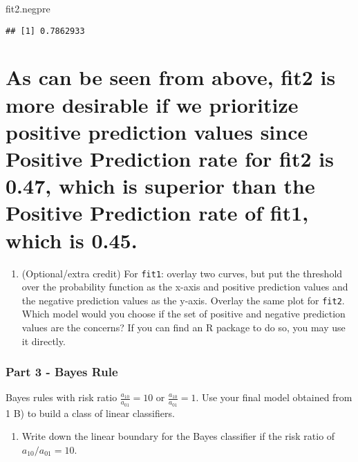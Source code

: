 \documentclass[]{article}
\newenvironment{Shaded}{\begin{snugshade}}{\end{snugshade}}
\newcommand{\NormalTok}[1]{#1}
\providecommand{\tightlist}{%
  \setlength{\itemsep}{0pt}\setlength{\parskip}{0pt}}
\begin{document}
\begin{Shaded}
\begin{Highlighting}[]
\NormalTok{fit2.negpre}
\end{Highlighting}
\end{Shaded}

\begin{verbatim}
## [1] 0.7862933
\end{verbatim}

\section{As can be seen from above, fit2 is more desirable if we
prioritize positive prediction values since Positive Prediction rate for
fit2 is 0.47, which is superior than the Positive Prediction rate of
fit1, which is
0.45.}\label{as-can-be-seen-from-above-fit2-is-more-desirable-if-we-prioritize-positive-prediction-values-since-positive-prediction-rate-for-fit2-is-0.47-which-is-superior-than-the-positive-prediction-rate-of-fit1-which-is-0.45.}

\begin{enumerate}
\def\labelenumi{\alph{enumi}.}
\setcounter{enumi}{3}
\tightlist
\item
  (Optional/extra credit) For \texttt{fit1}: overlay two curves, but put
  the threshold over the probability function as the x-axis and positive
  prediction values and the negative prediction values as the y-axis.
  Overlay the same plot for \texttt{fit2}. Which model would you choose
  if the set of positive and negative prediction values are the
  concerns? If you can find an R package to do so, you may use it
  directly.
\end{enumerate}

\subsubsection{Part 3 - Bayes Rule}\label{part-3---bayes-rule}

Bayes rules with risk ratio \(\frac{a_{10}}{a_{01}}=10\) or
\(\frac{a_{10}}{a_{01}}=1\). Use your final model obtained from 1 B) to
build a class of linear classifiers.

\begin{enumerate}
\def\labelenumi{\alph{enumi}.}
\tightlist
\item
  Write down the linear boundary for the Bayes classifier if the risk
  ratio of \(a_{10}/a_{01}=10\).
\end{enumerate}
\end{document}
